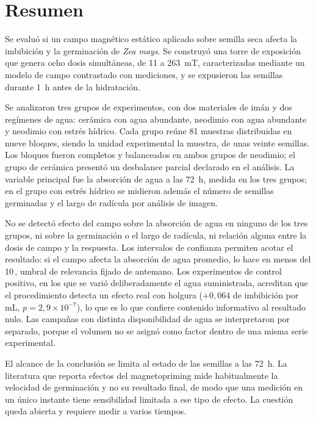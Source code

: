 \chapter*{Resumen}

Se evaluó si un campo magnético estático aplicado sobre semilla seca afecta la imbibición y la germinación de \textit{Zea mays}. Se construyó una torre de exposición que genera ocho dosis simultáneas, de 11 a 263~mT, caracterizadas mediante un modelo de campo contrastado con mediciones, y se expusieron las semillas durante 1~h antes de la hidratación.

Se analizaron tres grupos de experimentos, con dos materiales de imán y dos regímenes de agua: cerámica con agua abundante, neodimio con agua abundante y neodimio con estrés hídrico. Cada grupo reúne 81 muestras distribuidas en nueve bloques, siendo la unidad experimental la muestra, de unas veinte semillas. Los bloques fueron completos y balanceados en ambos grupos de neodimio; el grupo de cerámica presentó un desbalance parcial declarado en el análisis. La variable principal fue la absorción de agua a las 72~h, medida en los tres grupos; en el grupo con estrés hídrico se midieron además el número de semillas germinadas y el largo de radícula por análisis de imagen.

No se detectó efecto del campo sobre la absorción de agua en ninguno de los tres grupos, ni sobre la germinación o el largo de radícula, ni relación alguna entre la dosis de campo y la respuesta. Los intervalos de confianza permiten acotar el resultado: si el campo afecta la absorción de agua promedio, lo hace en menos del 10\,\pct, umbral de relevancia fijado de antemano. Los experimentos de control positivo, en los que se varió deliberadamente el agua suministrada, acreditan que el procedimiento detecta un efecto real con holgura (\(+0{,}064\) de imbibición por mL, \(p = 2{,}9\times10^{-7}\)), lo que es lo que confiere contenido informativo al resultado nulo. Las campañas con distinta disponibilidad de agua se interpretaron por separado, porque el volumen no se asignó como factor dentro de una misma serie experimental.

El alcance de la conclusión se limita al estado de las semillas a las 72~h. La literatura que reporta efectos del magnetopriming mide habitualmente la velocidad de germinación y no su resultado final, de modo que una medición en un único instante tiene sensibilidad limitada a ese tipo de efecto. La cuestión queda abierta y requiere medir a varios tiempos.

